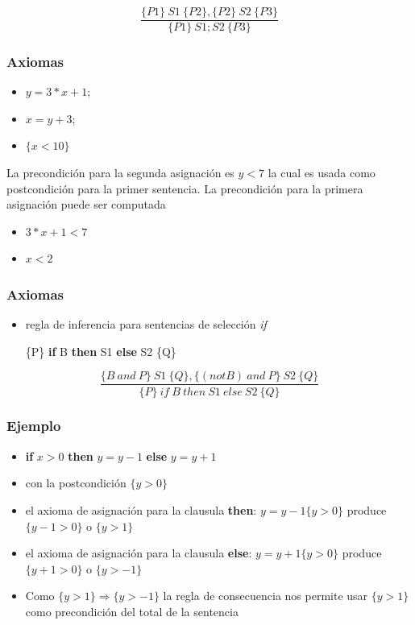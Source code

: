 \documentclass[11pt]{article}
\begin{document}
\[ \frac{ \{P1\} \ S1 \ \{P2\}, \{P2\} \ S2 \ \{P3\}}{\{P1\} \ S1;S2 \ \{P3\}} \]

\subsubsection*{Axiomas}
\label{sec:orgccae7ab}
\begin{itemize}
\item \(y = 3 * x + 1\);

\item \(x =  y + 3\);

\item \(\{ x < 10 \}\)
\end{itemize}

La precondición para la segunda asignación es \(y < 7\) la cual es
usada como postcondición para la primer sentencia. La precondición
para la primera asignación puede ser computada 

\begin{itemize}
\item \(3 * x + 1 < 7\)

\item \(x < 2\)
\end{itemize}

\subsubsection*{Axiomas}
\label{sec:orge0e3476}
\begin{itemize}
\item regla de inferencia para sentencias de selección  \emph{if}

\{P\} \textbf{if} B \textbf{then} S1 \textbf{else} S2 \{Q\}
\end{itemize}

\[ \frac{ \{B \ and \ P \} \ S1 \ \{Q\}, \{(not B) \ and \ P\} \ S2 \ 
\{Q\}}{\{P\} \ if \ B \ then \ S1 \ else \ S2 \ \{Q\}}\]

\subsubsection*{Ejemplo}
\label{sec:orgde11d1e}
\begin{itemize}
\item \textbf{if} \(x > 0\) \textbf{then} \(y = y - 1\) \textbf{else} \(y =  y + 1\)
\end{itemize}
\begin{itemize}
\item con la postcondición \(\{ y > 0 \}\)
\item el axioma de asignación para la clausula \textbf{then}: \(y = y - 1  \{ y
  > 0 \}\)  produce \(\{ y - 1 > 0 \}\) o \(\{ y > 1 \}\)
\item el axioma de asignación para la clausula \textbf{else}: \(y = y + 1  \{ y
  > 0 \}\)  produce \(\{ y + 1 > 0 \}\) o \(\{ y > -1 \}\)
\item Como \(\{ y > 1 \} \Rightarrow \{ y > -1 \}\) la regla de
consecuencia nos permite usar \(\{ y > 1 \}\) como precondición
del total de la sentencia
\end{itemize}
\end{document}
